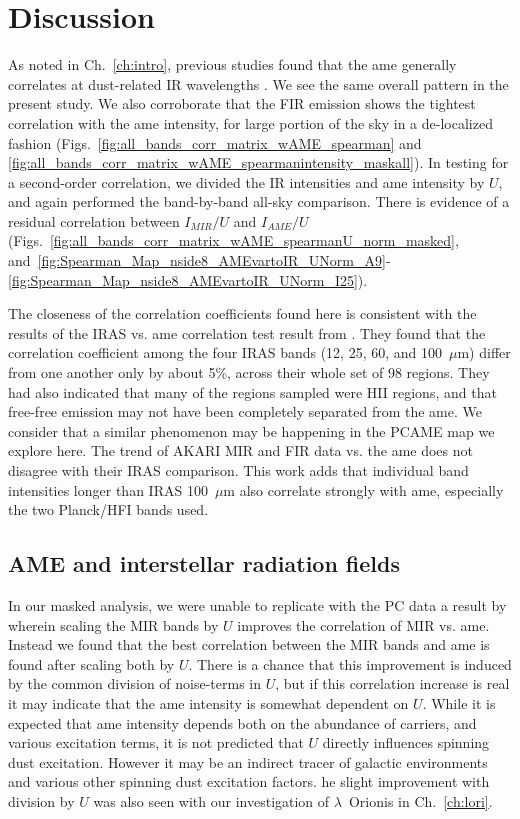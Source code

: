     \section{Discussion}
        As noted in Ch.~\ref{ch:intro}, previous studies found that the \acrshort{ame} generally correlates at dust-related IR wavelengths \citep{ysard10b,planckXV, hensley16}. We see the same overall pattern in the present study. We also corroborate that the FIR emission shows the tightest correlation with the \acrshort{ame} intensity, for large portion of the sky in a de-localized fashion (Figs.~\ref{fig:all_bands_corr_matrix_wAME_spearman} and~ \ref{fig:all_bands_corr_matrix_wAME_spearmanintensity_maskall}). In testing for a second-order correlation, we divided the IR intensities and \acrshort{ame} intensity by $U$, and again performed the band-by-band all-sky comparison. There is evidence of a residual correlation between $I_{MIR}/U$ and $I_{AME}/U$ (Figs.~\ref{fig:all_bands_corr_matrix_wAME_spearmanU_norm_masked}, and~\ref{fig:Spearman_Map_nside8_AMEvartoIR_UNorm_A9}-\ref{fig:Spearman_Map_nside8_AMEvartoIR_UNorm_I25}).

       The closeness of the correlation coefficients found here is consistent with the results of the IRAS vs. \acrshort{ame} correlation test result from \cite{planckXV}. They found that the correlation coefficient among the four IRAS bands (12, 25, 60, and 100~$\mu$m) differ from one another only by about 5\%, across their whole set of 98 regions. They had also indicated that many of the regions sampled were HII regions, and that free-free emission may not have been completely separated from the \acrshort{ame}. We consider that a similar phenomenon may be happening in the PCAME map we explore here. The trend of AKARI MIR and FIR data vs. the \acrshort{ame} does not disagree with their IRAS comparison. This work adds that individual band intensities longer than IRAS 100~$\mu$m also correlate strongly with \acrshort{ame}, especially the two Planck/HFI bands used.

          \subsection{AME and interstellar radiation fields}
            In our masked analysis, we were unable to replicate with the PC data a result by \cite{ysard10b} wherein scaling the MIR bands by $U$ improves the correlation of MIR vs. \acrshort{ame}. Instead we found that the best correlation between the MIR bands and \acrshort{ame} is found after scaling both by $U$. There is a chance that this improvement is induced by the common division of noise-terms in $U$, but if this correlation increase is real it may indicate that the \acrshort{ame} intensity is somewhat dependent on $U$. While it is expected that \acrshort{ame} intensity depends both on the abundance of carriers, and various excitation terms, it is not predicted that $U$ directly influences spinning dust excitation. However it may be an indirect tracer of galactic environments and various other spinning dust excitation factors. he slight improvement with division by $U$ was also seen with our investigation of $\lambda$~Orionis in Ch.~\ref{ch:lori}.

